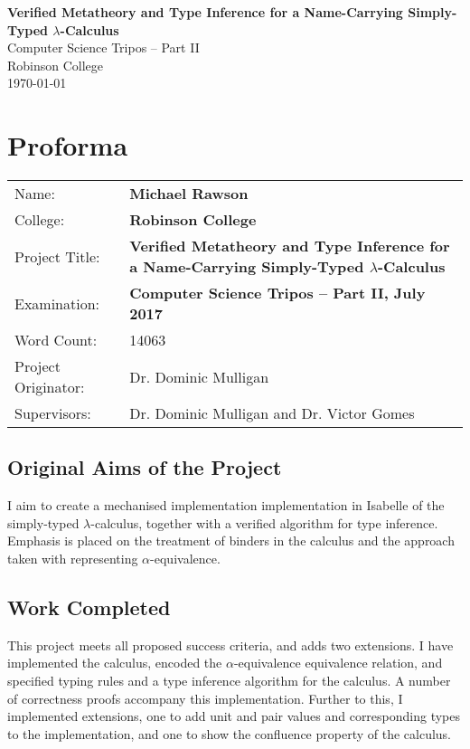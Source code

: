 \documentclass[12pt,a4paper,twoside,openright]{report}
\author{Michael Rawson}
\date{2016--17}
\newcommand{\thetitle}{Verified Metatheory and Type Inference for a Name-Carrying Simply-Typed \(\lambda\)-Calculus}
\begin{document}
\pagestyle{empty}
\vspace*{60mm}
\begin{center}
\Huge
\textbf{\thetitle}\\[5mm]
Computer Science Tripos -- Part II\\[5mm]
Robinson College\\[5mm]
\today
\end{center}

\pagestyle{plain}
\chapter*{Proforma}
{\large
\begin{tabular}{p{}p{}}
Name:              & \bf Michael Rawson\\
College:           & \bf Robinson College\\
Project Title:     & \bf \thetitle\\
Examination:       & \bf Computer Science Tripos -- Part II, July 2017\\
Word Count:        & 14063\footnotemark[1]\\
Project Originator:& Dr. Dominic Mulligan\\
Supervisors:       & Dr. Dominic Mulligan and Dr. Victor Gomes\\
\end{tabular}
}

\section*{Original Aims of the Project}
I aim to create a mechanised implementation implementation in Isabelle of the simply-typed \(\lambda\)-calculus, together with a verified algorithm for type inference.
Emphasis is placed on the treatment of binders in the calculus and the approach taken with representing \(\alpha\)-equivalence.

\section*{Work Completed}
This project meets all proposed success criteria, and adds two extensions.
I have implemented the calculus, encoded the \(\alpha\)-equivalence equivalence relation, and specified typing rules and a type inference algorithm for the calculus.
A number of correctness proofs accompany this implementation.
Further to this, I implemented extensions, one to add unit and pair values and corresponding types to the implementation, and one to show the confluence property of the calculus.
\end{document}
